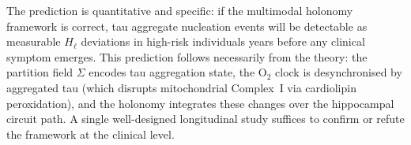 The prediction is quantitative and specific: if the multimodal holonomy
framework is correct, tau aggregate nucleation events will be detectable as
measurable $H_\ell$ deviations in high-risk individuals years before any
clinical symptom emerges.  This prediction follows necessarily from the
theory: the partition field $\Sigma$ encodes tau aggregation state, the
O$_2$ clock is desynchronised by aggregated tau (which disrupts mitochondrial
Complex~I via cardiolipin peroxidation), and the holonomy integrates these
changes over the hippocampal circuit path.  A single well-designed longitudinal
study suffices to confirm or refute the framework at the clinical level.
